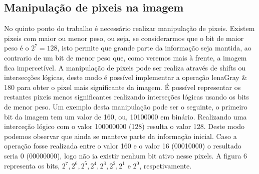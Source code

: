 \documentclass[12pt,a4paper]{article}
\begin{document}
\subsection{Manipulação de pixeis na imagem}
No quinto ponto do trabalho é necessário realizar manipulação de pixeis. Existem pixeis com maior ou menor peso, ou seja, se considerarmos que o bit de maior peso é o $2^7 = 128$, isto permite que grande parte da informação seja mantida, ao contrario de um bit de menor peso que, como veremos mais à frente, a imagem fica impercetível. A manipulação de pixeis pode ser realiza através de shifts ou intersecções lógicas, deste modo é possível implementar a operação lenaGray \& 180 para obter o pixel mais significante da imagem. É possível representar os restantes pixeis menos significantes realizando interseções  lógicas usando os bits de menor peso. Um exemplo desta manipulação pode ser o seguinte, o primeiro bit da imagem tem um valor de 160, ou, 10100000 em binário. Realizando uma interceção lógico com o valor 100000000 (128) resulta o valor 128. Deste modo podemos observar que ainda se manteve parte da informação inicial. Caso a operação fosse realizada entre o valor 160 e o valor 16 (00010000) o resultado seria 0 (00000000), logo não ia existir nenhum bit ativo nesse pixels. A figura 6 representa os bits, $2^7, 2^6, 2^5, 2^4, 2^3, 2^2, 2^1$ e $2^0$, respetivamente.

\clearpage
\end{document}
